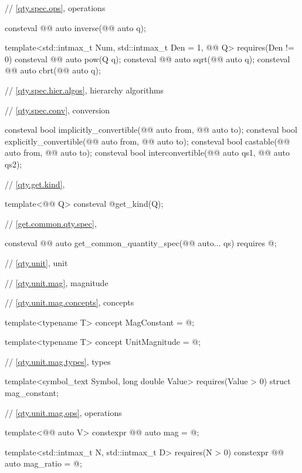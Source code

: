 \begin{codeblock}
{// \ref{qty.spec.ops}, operations

consteval @@ auto inverse(@@ auto q);

template<std::intmax_t Num, std::intmax_t Den = 1, @@ Q>
  requires(Den != 0)
consteval @@ auto pow(Q q);
consteval @@ auto sqrt(@@ auto q);
consteval @@ auto cbrt(@@ auto q);

// \ref{qty.spec.hier.algos}, hierarchy algorithms

// \ref{qty.spec.conv}, conversion

consteval bool implicitly_convertible(@@ auto from, @@ auto to);
consteval bool explicitly_convertible(@@ auto from, @@ auto to);
consteval bool castable(@@ auto from, @@ auto to);
consteval bool interconvertible(@@ auto qs1, @@ auto qs2);

// \ref{qty.get.kind}, 

template<@@ Q>
consteval @\seebelownc@ get_kind(Q);

// \ref{get.common.qty.spec}, 

consteval @@ auto get_common_quantity_spec(@@ auto... qs)
  requires @\seebelownc@;

// \ref{qty.unit}, unit

// \ref{qty.unit.mag}, magnitude

// \ref{qty.unit.mag.concepts}, concepts

template<typename T>
concept MagConstant = @\seebelownc@;

template<typename T>
concept UnitMagnitude = @\seebelownc@;

// \ref{qty.unit.mag.types}, types

template<symbol_text Symbol, long double Value>
  requires(Value > 0)
struct mag_constant;

// \ref{qty.unit.mag.ops}, operations

template<@@ auto V>
constexpr @@ auto mag = @\seebelownc@;

template<std::intmax_t N, std::intmax_t D>
  requires(N > 0)
constexpr @@ auto mag_ratio = @\seebelownc@;

}
\end{codeblock}
